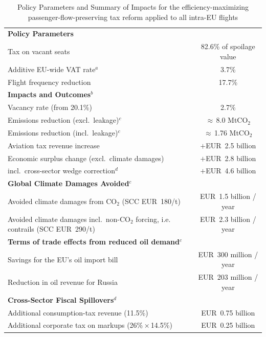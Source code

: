 \documentclass[../../main]{subfiles}
\begin{document}
\begin{table}[htbp]
\centering
\small
\caption{Policy Parameters and Summary of Impacts for the efficiency-maximizing passenger-flow-preserving tax reform applied to all intra-EU flights}
\label{tab:policy_impacts_eu}

\begin{tabularx}{\textwidth}{X c}
\multicolumn{2}{l}{\textbf{Policy Parameters}} \\
Tax on vacant seats & 82.6\% of spoilage value \\
Additive EU-wide VAT rate$^{a}$ & 3.7\%  \\
Flight frequency reduction & 17.7\% \\
\midrule
\multicolumn{2}{l}{\textbf{Impacts and Outcomes}$^{b}$} \\
Vacancy rate (from 20.1\%) & 2.7\% \\
Emissions reduction (excl.\ leakage)$^{c}$ & $\approx$\,8.0 MtCO$_2$ \\ %
Emissions reduction (incl.\ leakage)$^{c}$ & $\approx$\,1.76 MtCO$_2$ \\
Aviation tax revenue increase & $+$EUR~2.5 billion \\
Economic surplus change (excl.\ climate damages) & $+$EUR~2.8 billion \\
\quad incl.\ cross-sector wedge correction$^{d}$ & $+$EUR~4.6 billion \\ %
\midrule
\multicolumn{2}{l}{\textbf{Global Climate Damages Avoided}$^{c}$} \\
Avoided climate damages from CO$_2$ (SCC EUR~180/t) & EUR~1.5 billion / year \\
Avoided climate damages incl.\ non-CO$_2$ forcing, i.e. contrails (SCC EUR~290/t) & EUR~2.3 billion / year \\ %
\midrule
\multicolumn{2}{l}{\textbf{Terms of trade effects from reduced oil demand}$^{c}$} \\
Savings for the EU's oil import bill & EUR~300 million / year \\
Reduction in oil revenue for Russia & EUR~203 million / year \\
\midrule
\multicolumn{2}{l}{\textbf{Cross-Sector Fiscal Spillovers}$^{d}$} \\
Additional consumption-tax revenue (11.5\%) & EUR~0.75 billion \\
Additional corporate tax on markups (26\%\,$\times$\,14.5\%) & EUR~0.25 billion \\ 
\bottomrule
\end{tabularx}


\end{table}
\end{document}
